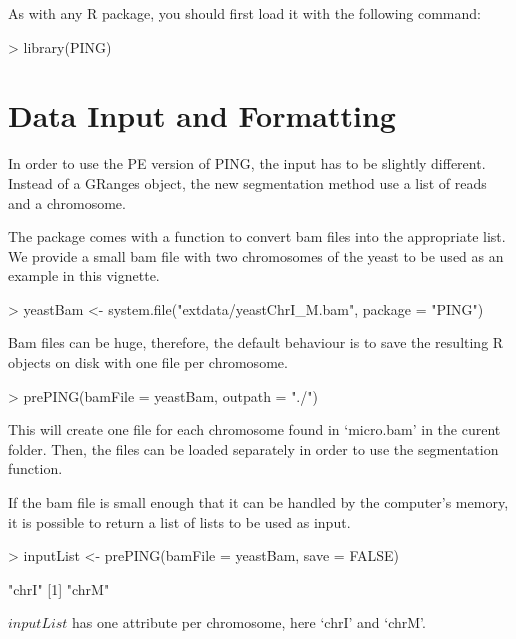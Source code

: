 \documentclass[11pt]{article}
\begin{document}
As with any R package, you should first load it with the following command:

\begin{Schunk}
\begin{Sinput}
> library(PING)
\end{Sinput}
\end{Schunk}

\section{Data Input and Formatting}
In order to use the PE version of PING, the input has to be slightly different.
Instead of a GRanges object, the new segmentation method use a list of reads and
a chromosome.


The package comes with a function to convert bam files into the appropriate
list. We provide a small bam file with two chromosomes of the yeast to be used
as an example in this vignette.

\begin{Schunk}
\begin{Sinput}
> yeastBam <- system.file("extdata/yeastChrI_M.bam", package = "PING")
\end{Sinput}
\end{Schunk}

Bam files can be huge, therefore, the default behaviour is to save the resulting
R objects on disk with one file per chromosome.

\begin{Schunk}
\begin{Sinput}
> prePING(bamFile = yeastBam, outpath = "./")
\end{Sinput}
\end{Schunk}
This will create one file for each chromosome found in `micro.bam' in the curent
folder. Then, the files can be loaded separately in order to use the
segmentation function.

If the bam file is small enough that it can be handled by the computer's memory,
it is possible to return a list of lists to be used as input. 
\begin{Schunk}
\begin{Sinput}
> inputList <- prePING(bamFile = yeastBam, save = FALSE)
\end{Sinput}
\begin{Soutput}
[1] "chrI"
[1] "chrM"
\end{Soutput}
\end{Schunk}
$inputList$ has one attribute per chromosome, here `chrI' and `chrM'.
\end{document}
